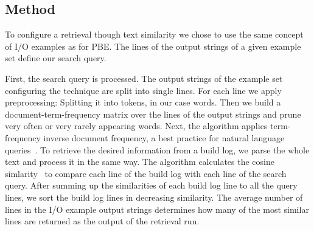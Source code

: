 \documentclass[\myrootdir/main.tex]{subfiles}
\begin{document}
\subsection{Method}
To configure a retrieval though text similarity we chose to use the same concept of I/O examples as for PBE.
The lines of the output strings of a given example set define our search query.

First, the search query is processed.
The output strings of the example set configuring the technique are split into single lines.
For each line we apply preprocessing: Splitting it into tokens, in our case words.
Then we build a document-term-frequency matrix over the lines of the output strings and prune very often or very rarely appearing words.
Next, the algorithm applies term-frequency inverse document frequency, a best practice for natural language queries~\cite{lee1997document}.
To retrieve the desired information from a build log, we parse the whole text and process it in the same way.
The algorithm calculates the cosine simlarity~ to compare each line of the build log with each line of the search query.
After summing up the similarities of each build log line to all the query lines, we sort the build log lines in decreasing similarity.
The average number of lines in the I/O example output strings determines how many of the most similar lines are returned as the output of the retrieval run.

\end{document}

